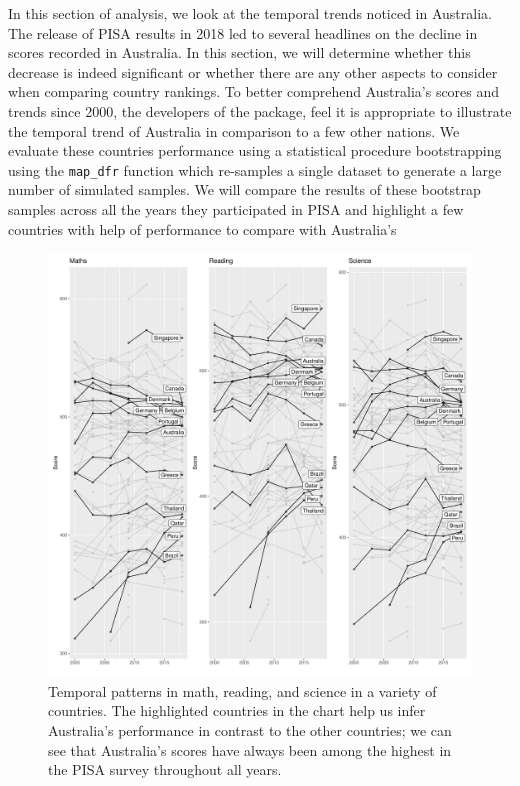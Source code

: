 In this section of analysis, we look at the temporal trends noticed in
Australia. The release of PISA results in 2018 led to several headlines
on the decline in scores recorded in Australia. In this section, we will
determine whether this decrease is indeed significant or whether there
are any other aspects to consider when comparing country rankings. To
better comprehend Australia's scores and trends since 2000, the
developers of the  package, feel it is
appropriate to illustrate the temporal trend of Australia in comparison
to a few other nations. We evaluate these countries performance using a
statistical procedure bootstrapping using the \texttt{map\_dfr} function
which re-samples a single dataset to generate a large number of
simulated samples. We will compare the results of these bootstrap
samples across all the years they participated in PISA and highlight a
few countries with help of  \citep{gghighlight}
performance to compare with Australia's

\begin{Schunk}
\begin{figure}[H]
\includegraphics[width=1\linewidth]{learningtower_files/figure-latex/bs-plot-1} \caption[Temporal patterns in math, reading, and science in a variety of countries]{Temporal patterns in math, reading, and science in a variety of countries. The highlighted countries in the chart help us infer Australia's performance in contrast to the other countries; we can see that Australia's scores have always been among the highest in the PISA survey throughout all years.}\label{fig:bs-plot}
\end{figure}
\end{Schunk}

